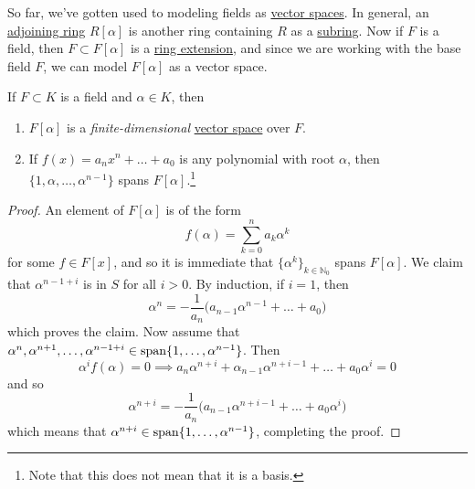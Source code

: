   So far, we've gotten used to modeling fields as \hyperref[def:vector-space]{vector spaces}. In general, an \hyperref[def:adjoining_ring]{adjoining ring} $R[\alpha]$ is another ring containing $R$ as a \hyperref[def:subring]{subring}. Now if $F$ is a field, then $F \subset F[\alpha]$ is a \hyperref[def:ring-extension]{ring extension}, and since we are working with the base field $F$, we can model $F[\alpha]$ as a vector space. 

  \begin{theorem}
    \label{thm:adjoining-field-is-finite-dimensional-vector}
    If $F \subset K$ is a field and $\alpha \in K$, then 
    \begin{enumerate}
      \item $F[\alpha]$ is a \textit{finite-dimensional} \hyperref[def:vector-space]{vector space} over $F$. 
      \item If $f(x) = a_n x^n + \ldots + a_0$ is any polynomial with root $\alpha$, then $\{1, \alpha, \ldots, \alpha^{n-1}\}$ spans $F[\alpha]$.\footnote{Note that this does not mean that it is a basis.} 
    \end{enumerate}
  \end{theorem}
  \begin{proof}
    An element of $F[\alpha]$ is of the form 
    \begin{equation}
      f(\alpha) = \sum_{k=0}^n a_k \alpha^k
    \end{equation} 
    for some $f \in F[x]$, and so it is immediate that $\{\alpha^k\}_{k \in \mathbb{N}_0}$ spans $F[\alpha]$. We claim that $\alpha^{n-1+i}$ is in $S$ for all $i > 0$. By induction, if $i = 1$, then 
    \begin{equation}
      \alpha^n = -\frac{1}{a_n} \big( a_{n-1} \alpha^{n-1} + \ldots + a_0 \big)
    \end{equation}
    which proves the claim. Now assume that $\alpha^n, \alpha^{n+1}, \ldots, \alpha^{n-1+i} \in \operatorname{span}\{1, \ldots, \alpha^{n-1}\}$. Then 
    \begin{equation}
      \alpha^i f(\alpha) = 0 \implies a_n \alpha^{n+i} + \alpha_{n-1} \alpha^{n+i-1} + \ldots + a_0 \alpha^i = 0 
    \end{equation}
    and so 
    \begin{equation}
      \alpha^{n+i} = -\frac{1}{a_n} \big(a_{n-1} \alpha^{n+i-1} + \ldots + a_0 \alpha^i)
    \end{equation}
    which means that $\alpha^{n+i} \in \operatorname{span}\{1, \ldots, \alpha^{n-1}\}$, completing the proof. 
  \end{proof} 

